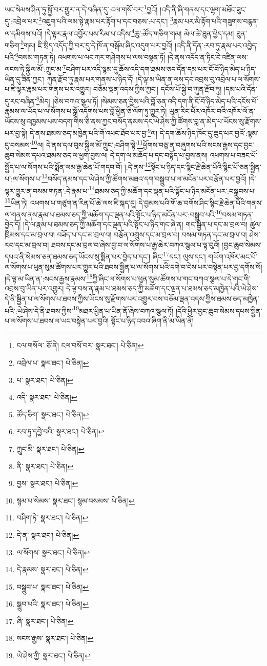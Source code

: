 ཡང་སེམས་ཤིན་ཏུ་སྐྱོ་བར་གྱུར་ན་དེ་བཞིན་དུ་:ངལ་གསོ་བར་\footnote{ངལ་གསོལ་  ཅོ་ནེ། ངལ་བསོ་བར་  སྣར་ཐང་།  པེ་ཅིན། }བྱའོ། །འདི་ནི་ཞི་གནས་དང་ལྷག་མཐོང་ཟུང་དུ་:འབྲེལ་པར་\footnote{འབྲེལ་པ་  སྣར་ཐང་།  པེ་ཅིན། }འཇུག་པའི་ལམ་སྟེ་རྣམ་པར་རྟོག་པ་དང་བཅས་:པ་དང་། \footnote{པ་  སྣར་ཐང་།  པེ་ཅིན། }རྣམ་པར་མི་རྟོག་པའི་གཟུགས་བརྙན་ལ་དམིགས་པའོ། །དེ་ལྟར་རྣལ་འབྱོར་པས་རིམ་པ་འདིས་\footnote{འདི་  སྣར་ཐང་།  པེ་ཅིན། }ཆུ་:ཚོད་གཅིག་གམ། མེལ་ཚེ་ཐུན་ཕྱེད་དམ། ཐུན་གཅིག་\footnote{ཚོད་ཅིག་  སྣར་ཐང་།  པེ་ཅིན། }གམ། ཇི་སྲིད་འདོད་ཀྱི་བར་དུ་དེ་ཁོ་ན་བསྒོམ་ཞིང་འདུག་པར་བྱའོ། །འདི་ནི་དོན་:རབ་ཏུ་རྣམ་པར་འབྱེད་པའི་\footnote{རབ་ཏུ་དབྱེ་བའི་  སྣར་ཐང་།  པེ་ཅིན། }བསམ་གཏན་ཏེ། འཕགས་པ་ལང་ཀར་གཤེགས་པ་ལས་བསྟན་ཏོ། །དེ་ནས་འདོད་ན་ཏིང་ངེ་འཛིན་ལས་ལངས་ཏེ་སྐྱིལ་མོ་:ཀྲུང་མ་\footnote{ཀྲུང་མི་  སྣར་ཐང་།  པེ་ཅིན། }བཤིག་པར་འདི་སྙམ་དུ་ཆོས་འདི་དག་ཐམས་ཅད་དོན་དམ་པར་ངོ་བོ་ཉིད་མེད་པ་ཉིད་ཡིན་དུ་ཟིན་ཀྱང་། ཀུན་རྫོབ་ཏུ་རྣམ་པར་གནས་པ་ཉིད་དོ། །དེ་ལྟ་མ་ཡིན་ན་ལས་དང་འབྲས་བུ་འབྲེལ་པ་ལ་སོགས་པ་ཇི་ལྟར་རྣམ་པར་གནས་པར་འགྱུར། བཅོམ་ལྡན་འདས་ཀྱིས་ཀྱང་། དངོས་པོ་སྐྱེ་བ་ཀུན་རྫོབ་ཏུ། །དམ་པའི་དོན་དུ་རང་བཞིན་\footnote{ནི་  སྣར་ཐང་།  པེ་ཅིན། }མེད། །ཅེས་བཀའ་སྩལ་ཏོ། །སེམས་ཅན་བྱིས་པའི་བློ་ཅན་འདི་དག་ནི་ངོ་བོ་ཉིད་མེད་པའི་དངོས་པོ་རྣམས་ལ་ཡོད་པ་ལ་སོགས་པ་སྒྲོ་འདོགས་པས་བློ་ཕྱིན་ཅི་ལོག་ཏུ་གྱུར་ཏེ། ཡུན་རིང་པོར་འཁོར་བའི་འཁོར་ལོ་ན་ཡོངས་སུ་འཁྱམས་པས་བདག་གིས་ཅི་ནས་ཀྱང་བསོད་ནམས་དང་ཡེ་ཤེས་ཀྱི་ཚོགས་བླ་ན་མེད་པ་ཡོངས་སུ་རྫོགས་པར་བྱ་སྟེ། དེ་ནས་ཐམས་ཅད་མཁྱེན་པའི་གོ་འཕང་ཐོབ་པར་བྱ་\footnote{བྱས་  སྣར་ཐང་།  པེ་ཅིན། }ལ། དེ་དག་ཆོས་ཉིད་ཁོང་དུ་ཆུད་པར་བྱའོ་:སྙམ་དུ་བསམས་\footnote{སྙམ་པ་སེམས་  སྣར་ཐང་། སྙམ་བསམས་  པེ་ཅིན། }ལ། དེ་ནས་དལ་བུས་སྐྱིལ་མོ་ཀྲུང་:བཤིག་སྟེ་\footnote{བཤིག་ཏེ་  སྣར་ཐང་།  པེ་ཅིན། }ཕྱོགས་བཅུ་ན་བཞུགས་པའི་སངས་རྒྱས་དང་བྱང་ཆུབ་སེམས་དཔའ་ཐམས་ཅད་ལ་ཕྱག་བྱས་ལ། དེ་དག་ལ་མཆོད་པ་དང་བསྟོད་པ་བྱས་ནས། འཕགས་པ་བཟང་པོ་སྤྱོད་པ་ལ་སོགས་པའི་སྨོན་ལམ་རྒྱ་ཆེན་པོ་གདབ་བོ། །:དེ་ནས་\footnote{དེ་ན་  སྣར་ཐང་།  པེ་ཅིན། }སྟོང་པ་ཉིད་དང་སྙིང་རྗེ་ཆེན་པོའི་སྙིང་པོ་ཅན་སྦྱིན་པ་:ལ་སོགས་པ་\footnote{ལ་སོགས་  སྣར་ཐང་།  པེ་ཅིན། }བསོད་ནམས་དང་ཡེ་ཤེས་ཀྱི་ཚོགས་མཐའ་དག་བསྒྲུབ་པ་ལ་མངོན་པར་བརྩོན་པར་བྱའོ། །དེ་ལྟར་གྱུར་ན་བསམ་གཏན་:དེ་རྣམ་པ་\footnote{དེ་རྣམས་  སྣར་ཐང་།  པེ་ཅིན། }ཐམས་ཅད་ཀྱི་མཆོག་དང་ལྡན་པའི་སྟོང་པ་ཉིད་མངོན་པར་:བསྒྲུབས་པ་\footnote{བསྒྲུབ་པ་  སྣར་ཐང་།  པེ་ཅིན། }ཡིན་ཏེ། འཕགས་པ་གཙུག་ན་རིན་པོ་ཆེ་ལས་ཇི་སྐད་དུ། དེ་བྱམས་པའི་གོ་ཆ་བགོས་ཤིང་སྙིང་རྗེ་ཆེན་པོའི་གནས་ལ་གནས་ནས་རྣམ་པ་ཐམས་ཅད་ཀྱི་མཆོག་དང་ལྡན་པའི་སྟོང་པ་ཉིད་མངོན་པར་:བསྒྲུབ་པའི་\footnote{སྒྲུབ་པའི་  སྣར་ཐང་།  པེ་ཅིན། }བསམ་གཏན་བྱེད་དོ། །དེ་ལ་རྣམ་པ་ཐམས་ཅད་ཀྱི་མཆོག་དང་ལྡན་པའི་སྟོང་པ་ཉིད་གང་ཞེ་ན། གང་སྦྱིན་པ་དང་མ་བྲལ་བ། ཚུལ་ཁྲིམས་དང་མ་བྲལ་བ། བཟོད་པ་དང་མ་བྲལ་བ། བརྩོན་འགྲུས་དང་མ་བྲལ་བ། བསམ་གཏན་དང་མ་བྲལ་བ། ཤེས་རབ་དང་མ་བྲལ་བ། ཐབས་དང་མ་བྲལ་བ་ཞེས་བྱ་བ་ལ་སོགས་པ་རྒྱ་ཆེར་བཀའ་སྩལ་པ་ལྟ་བུའོ། །བྱང་ཆུབ་སེམས་དཔའ་ནི་སེམས་ཅན་ཐམས་ཅད་ཡོངས་སུ་སྨིན་པར་བྱེད་པ་དང་། ཞིང་\footnote{ཞི་  སྣར་ཐང་།  པེ་ཅིན། }དང་། ལུས་དང་། གཡོག་འཁོར་མང་པོ་ལ་སོགས་པ་ཕུན་སུམ་ཚོགས་པར་གྱུར་པའི་ཐབས་སྦྱིན་པ་ལ་སོགས་པའི་དགེ་བ་ངེས་པར་བསྟེན་པར་བྱ་དགོས་སོ། །དེ་ལྟ་མ་ཡིན་ན་:སངས་རྒྱས་རྣམས་\footnote{སངས་རྒྱས་  སྣར་ཐང་།  པེ་ཅིན། }ཀྱི་ཞིང་ལ་སོགས་པ་ཕུན་སུམ་ཚོགས་པ་གང་བཀའ་སྩལ་པ་དེ་གང་གི་འབྲས་བུ་ཡིན་པར་འགྱུར། དེ་ལྟ་བས་ན་རྣམ་པ་ཐམས་ཅད་ཀྱི་མཆོག་དང་ལྡན་པ་ཐམས་ཅད་མཁྱེན་པའི་ཡེ་ཤེས་དེ་ནི་སྦྱིན་པ་ལ་སོགས་པ་ཐབས་ཀྱིས་ཡོངས་སུ་རྫོགས་པར་འགྱུར་བས་བཅོམ་ལྡན་འདས་ཀྱིས་ཐམས་ཅད་མཁྱེན་པའི་:ཡེ་ཤེས་དེ་ནི་ཐབས་ཀྱིས་\footnote{ཡེ་ཤེས་ཀྱི་  སྣར་ཐང་།  པེ་ཅིན། }མཐར་ཕྱིན་པ་ཡིན་ནོ་ཞེས་བཀའ་སྩལ་ཏོ། །དེའི་ཕྱིར་བྱང་ཆུབ་སེམས་དཔས་སྦྱིན་པ་ལ་སོགས་པ་ཐབས་ལ་ཡང་བསྟེན་པར་བྱའི། སྟོང་པ་ཉིད་འབའ་ཞིག་ནི་མ་ཡིན་ནོ། 
